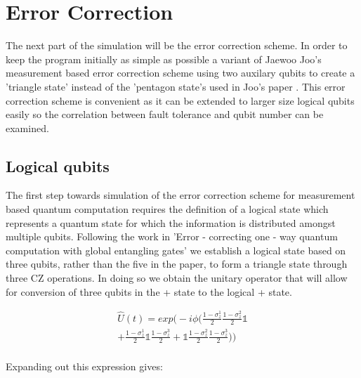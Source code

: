 
\chapter{Error Correction} %

\label{ch:name} %

The next part of the simulation will be the error correction scheme. In order to keep the program initially as simple as possible a variant of Jaewoo Joo's measurement based error correction scheme  using two auxilary qubits to create a 'triangle state' instead of the 'pentagon state's used in Joo's paper \citep{joo_error-correcting_2009}. This error correction scheme is convenient as it can be extended to larger size logical qubits easily so the correlation between fault tolerance and qubit number can be examined.


\section{Logical qubits}

The first step towards simulation of the error correction scheme for measurement based quantum computation requires the definition of a logical state which represents a quantum state for which the information is distributed amongst multiple qubits. Following the work in 'Error - correcting one - way quantum computation with global entangling gates' \citep{joo_error-correcting_2009} we establish a logical state based on three qubits, rather than the five in the paper, to form a triangle state through three CZ operations. In doing so we obtain the unitary operator that will allow for conversion of three qubits in the  + state to the logical + state.

\begin{multline}
\hat{U} (t) =
exp\Bigg(-i \phi \bigg( 
\frac{1 - \sigma^{1}_{z}}{2} \frac{1 - \sigma^{2}_{z}}{2}\mathbb{1} \\
+ \frac{1 - \sigma^{1}_{z}}{2} \mathbb{1} \frac{1 - \sigma^{3}_{z}}{2}
+ \mathbb{1}\frac{1 - \sigma^{2}_{z}}{2} \frac{1 - \sigma^{3}_{z}}{2}
\bigg)\Bigg) \\
\end{multline}

Expanding out this expression gives:

